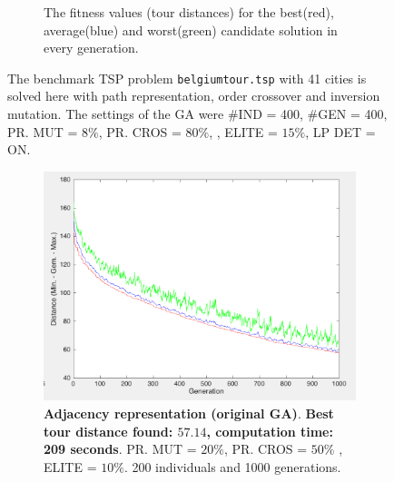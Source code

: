 \begin{figure}[!]
\begin{subfigure}{.45\textwidth}
  \caption{The fitness values (tour distances) for the best(red), average(blue) and worst(green) candidate solution in every generation. \\}
  \label{fig:belgium_tour_4_gen}
\end{subfigure}
\caption{The benchmark TSP problem \texttt{belgiumtour.tsp} with 41 cities is solved here with path representation, order crossover and inversion mutation. The settings of the GA were \#IND = 400, \#GEN = 400, PR. MUT = $8\%$, PR. CROS = $80\%$, , ELITE = $15\%$, LP DET = ON.}
\label{fig:belgium_tour_4}
\end{figure}

\begin{figure}[!]
\centering
\begin{subfigure}{0.45\textwidth}
  \centering
  \includegraphics[width=1\textwidth]{../figures/figures_question_4/adj_vraag4_off_gen}
      \caption{\textbf{Adjacency representation (original GA)}. \textbf{Best tour distance found: $\mathbf{57.14}$, computation time: 209 seconds}. PR. MUT = $20\%$, PR. CROS = $50\%$ , ELITE = $10\%$. 200 individuals and 1000 generations.} 
      \label{fig:adj_vraag4_off_gen}
\end{subfigure}%
\hspace{0.05\textwidth}
\begin{subfigure}{0.45\textwidth}
  \centering

\end{subfigure}
\end{figure}
